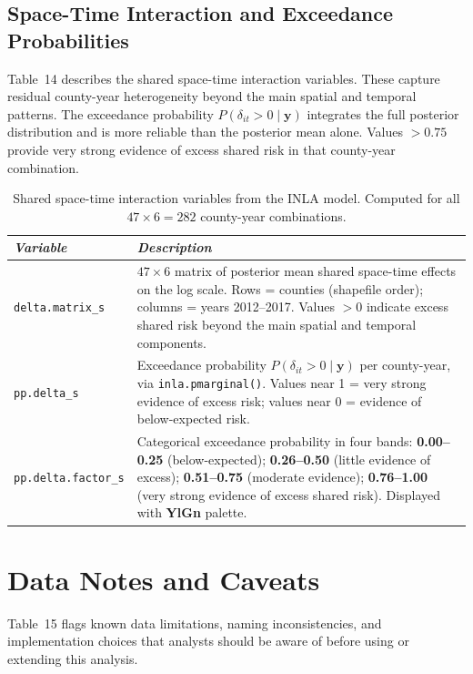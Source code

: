\documentclass[11pt,a4paper]{article}
\newcommand{\code}[1]{\texttt{\small #1}}
\begin{document}
\subsection{Space-Time Interaction and Exceedance Probabilities}

Table~14 describes the shared space-time interaction variables. These capture
residual county-year heterogeneity beyond the main spatial and temporal
patterns. The exceedance probability $P(\delta_{it}>0\mid\mathbf{y})$ integrates
the full posterior distribution and is more reliable than the posterior mean
alone. Values $>0.75$ provide very strong evidence of excess shared risk in that
county-year combination.

\begin{table}[H]
\caption{Shared space-time interaction variables from the INLA model. Computed for all $47\times6=282$ county-year combinations.}
\renewcommand{\arraystretch}{1.10}
\scriptsize\begin{tabularx}{\textwidth}{@{}L{3.2cm}X@{}}
\toprule
\textit{Variable} & \textit{Description}\\
\midrule
\code{delta.matrix\_s}
  & $47\times6$ matrix of posterior mean shared space-time effects on the log scale. Rows = counties (shapefile order); columns = years 2012--2017. Values $>0$ indicate excess shared risk beyond the main spatial and temporal components.\\
\code{pp.delta\_s}
  & Exceedance probability $P(\delta_{it}>0\mid\mathbf{y})$ per county-year, via \code{inla.pmarginal()}. Values near 1 = very strong evidence of excess risk; values near 0 = evidence of below-expected risk.\\
\code{pp.delta.factor\_s}
  & Categorical exceedance probability in four bands: \textbf{0.00--0.25} (below-expected); \textbf{0.26--0.50} (little evidence of excess); \textbf{0.51--0.75} (moderate evidence); \textbf{0.76--1.00} (very strong evidence of excess shared risk). Displayed with \textbf{YlGn} palette.\\
\bottomrule
\end{tabularx}
\renewcommand{\arraystretch}{1.10}
\end{table}

\section{Data Notes and Caveats}

Table~15 flags known data limitations, naming inconsistencies, and
implementation choices that analysts should be aware of before using or
extending this analysis.
\end{document}
